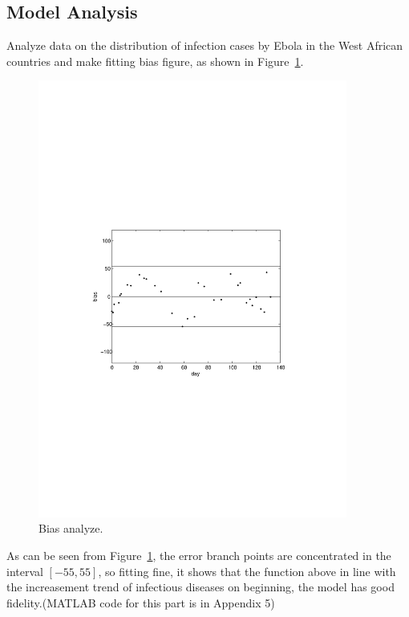 \subsection{Model Analysis}
Analyze data on the distribution of infection cases by Ebola 
in the West African countries and make fitting bias figure, as
shown in Figure~\ref{fig:6}.\\
\begin{figure}
\centering
\includegraphics[width=4in]{imgs/cases_fit_bias.pdf}
\caption{Bias analyze.}
\label{fig:6}
\end{figure}
As can be seen from Figure~\ref{fig:6}, the error branch points are
concentrated in the interval $[-55,55]$, so fitting fine,
it shows that the function above in line with the increasement
trend of infectious diseases on beginning, the model has good
fidelity.(MATLAB code for this part is in Appendix 5)
